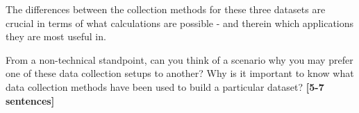 \documentclass{csci1430}
\begin{document}






\begin{subquestion}[points=4]
The differences between the collection methods for these three datasets are crucial in terms of what calculations are possible - and therein which applications they are most useful in.
\end{subquestion}

\begin{orangebox} 
From a non-technical standpoint, can you think of a scenario why you may prefer one of these data collection setups to another? Why is it important to know what data collection methods have been used to build a particular dataset? \textbf{[5-7 sentences]}
\end{orangebox}

\begin{answer}[height=20]
\end{answer}
\end{document}
